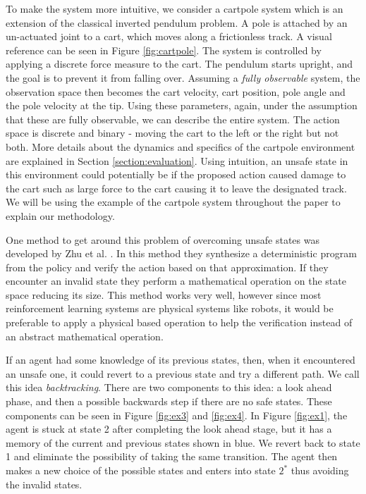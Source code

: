 \documentclass[acmsmall,review,authorversion]{acmart}
\begin{document}
To make the system more intuitive, we consider a cartpole system which is an extension of the classical inverted pendulum problem. A pole is attached by an un-actuated joint to a cart, which moves along a frictionless track. A visual reference can be seen in Figure \ref{fig:cartpole}. The system is controlled by applying a discrete force measure to the cart. The pendulum starts upright, and the goal is to prevent it from falling over. Assuming a \emph{fully observable} system, the observation space then becomes the cart velocity, cart position, pole angle and the pole velocity at the tip. Using these parameters, again, under the assumption that these are fully observable, we can describe the entire system. The action space is discrete and binary - moving the cart to the left or the right but not both. More details about the dynamics and specifics of the cartpole environment are explained in Section \ref{section:evaluation}. Using intuition, an unsafe state in this environment could potentially be if the proposed action caused damage to the cart such as large force to the cart causing it to leave the designated track. We will be using the example of the cartpole system throughout the paper to explain our methodology.

One method to get around this problem of overcoming unsafe states was developed by Zhu et al. \cite{zhu:2019}. In this method they synthesize a deterministic program from the policy and verify the action based on that approximation. If they encounter an invalid state they perform a mathematical operation on the state space reducing its size. This method works very well, however since most reinforcement learning systems are physical systems like robots, it would be preferable to apply a physical based operation to help the verification instead of an abstract mathematical operation.

If an agent had some knowledge of its previous states, then, when it encountered an unsafe one, it could revert to a previous state and try a different path. We call this idea \emph{backtracking}. There are two components to this idea: a look ahead phase, and then a possible backwards step if there are no safe states. These components can be seen in Figure \ref{fig:ex3} and \ref{fig:ex4}. In Figure \ref{fig:ex1}, the agent is stuck at state 2 after completing the look ahead stage, but it has a memory of the current and previous states shown in blue. We revert back to state 1 and eliminate the possibility of taking the same transition. The agent then makes a new choice of the possible states and enters into state $2^*$ thus avoiding the invalid states. 
\end{document}
